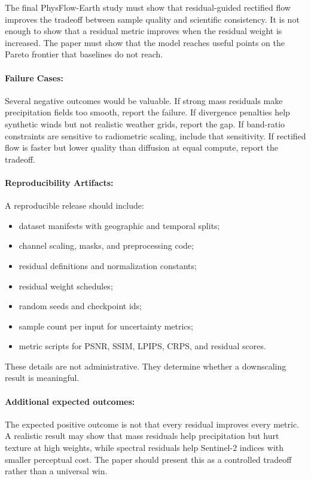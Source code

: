 \documentclass{article}
\begin{document}
The final PhysFlow-Earth study must show that residual-guided rectified flow improves the tradeoff between sample quality and scientific consistency. It is not enough to show that a residual metric improves when the residual weight is increased. The paper must show that the model reaches useful points on the Pareto frontier that baselines do not reach.

\paragraph{Failure Cases:}

Several negative outcomes would be valuable. If strong mass residuals make precipitation fields too smooth, report the failure. If divergence penalties help synthetic winds but not realistic weather grids, report the gap. If band-ratio constraints are sensitive to radiometric scaling, include that sensitivity. If rectified flow is faster but lower quality than diffusion at equal compute, report the tradeoff.

\paragraph{Reproducibility Artifacts:}

A reproducible release should include:
\begin{itemize}
  \item dataset manifests with geographic and temporal splits;
  \item channel scaling, masks, and preprocessing code;
  \item residual definitions and normalization constants;
  \item residual weight schedules;
  \item random seeds and checkpoint ids;
  \item sample count per input for uncertainty metrics;
  \item metric scripts for PSNR, SSIM, LPIPS, CRPS, and residual scores.
\end{itemize}
These details are not administrative. They determine whether a downscaling result is meaningful.

\paragraph{Additional expected outcomes:}

The expected positive outcome is not that every residual improves every metric. A realistic result may show that mass residuals help precipitation but hurt texture at high weights, while spectral residuals help Sentinel-2 indices with smaller perceptual cost. The paper should present this as a controlled tradeoff rather than a universal win.
\end{document}

